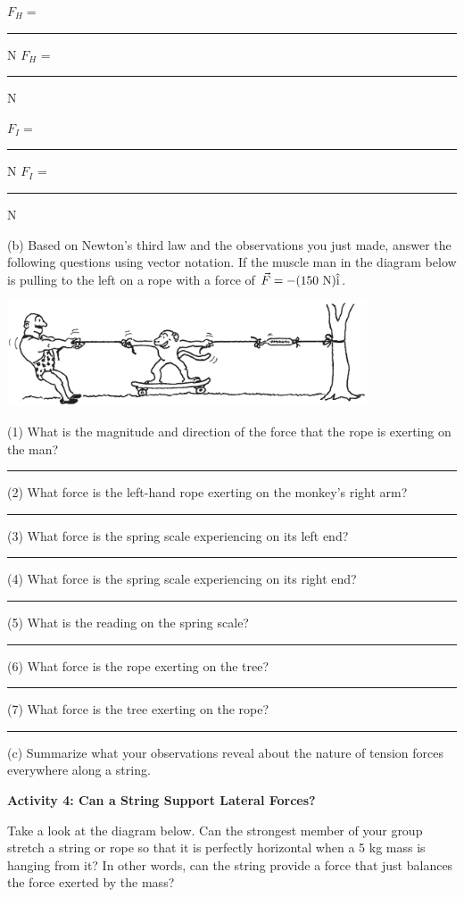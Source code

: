 \hfill{}$F_{H} = $ \rule{1.0in}{0.1pt} N \hfill{}$F_{H}$ = \rule{1.0in}{0.1pt} N\hfill{}

\hfill{}$F_{I} = $ \rule{1.0in}{0.1pt} N \hfill{}$F_{I}$ = \rule{1.0in}{0.1pt} N\hfill{}


\answerspace{0.5cm}

\pagebreak[3]
(b) Based on Newton's third law and the observations you just made, answer the
following questions using vector notation. If the muscle man in the diagram
below is pulling to the left on a rope with a force of $\vec F = -(150~\rm{N})\hat{i}$.

\vspace{0.3cm}
{\par\centering \includegraphics[width=0.8\textwidth]{newton/monkey.eps} \par}
\vspace{0.3cm}

(1) What is the magnitude and direction of the force that the rope is exerting
on the man? \rule{1.0in}{0.1pt}

(2) What force is the left-hand rope exerting on the monkey's right arm? \rule{1.0in}{0.1pt}

(3) What force is the spring scale experiencing on its left end? \rule{1.0in}{0.1pt}

(4) What force is the spring scale experiencing on its right end? \rule{1.0in}{0.1pt}

(5) What is the reading on the spring scale? \rule{1.0in}{0.1pt}

(6) What force is the rope exerting on the tree? \rule{1.0in}{0.1pt}

(7) What force is the tree exerting on the rope? \rule{1.0in}{0.1pt}

(c) Summarize what your observations reveal about the nature of tension forces
everywhere along a string.
\answerspace{15mm}

\textbf{Activity 4: Can a String Support Lateral Forces? }

Take a look at the diagram below. Can the strongest member of your group stretch
a string or rope so that it is perfectly horizontal when a 5 kg mass is hanging
from it? In other words, can the string provide a force that just balances the
force exerted by the mass?

